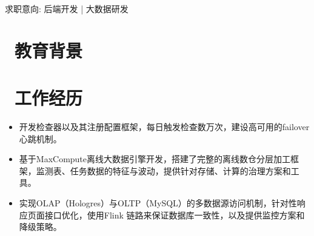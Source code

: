 \documentclass{resume}
\begin{document}


\centerline{求职意向: 后端开发 | 大数据研发}
\vspace{1ex}


\vspace{-1ex}
 
\section{\faGraduationCap\  教育背景}

\vspace{1ex}


\section{\faSitemap\ 工作经历}
\vspace{-0.5ex}
\begin{onehalfspacing}
\begin{itemize}
  \item 开发检查器以及其注册配置框架，每日触发检查数万次，建设高可用的failover心跳机制。
  \item 基于MaxCompute离线大数据引擎开发，搭建了完整的离线数仓分层加工框架，监测表、任务数据的特征与波动，提供针对存储、计算的治理方案和工具。
  \item 实现OLAP（Hologres）与OLTP（MySQL）的多数据源访问机制，针对性响应页面接口优化，使用Flink 链路来保证数据库一致性，以及提供监控方案和降级策略。
\end{itemize}
\end{onehalfspacing}
\end{document}
